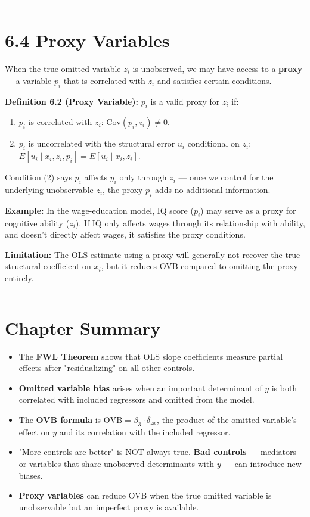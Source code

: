 \medskip\hrule\medskip

\section{6.4 Proxy Variables}

When the true omitted variable $z_i$ is unobserved, we may have access to a \textbf{proxy} --- a variable $p_i$ that is correlated with $z_i$ and satisfies certain conditions.

\textbf{Definition 6.2 (Proxy Variable):} $p_i$ is a valid proxy for $z_i$ if:
\begin{enumerate}
\item $p_i$ is correlated with $z_i$: $\text{Cov}(p_i, z_i) \neq 0$.
\item $p_i$ is uncorrelated with the structural error $u_i$ conditional on $z_i$: $E[u_i \mid x_i, z_i, p_i] = E[u_i \mid x_i, z_i]$.
\end{enumerate}

Condition (2) says $p_i$ affects $y_i$ only through $z_i$ --- once we control for the underlying unobservable $z_i$, the proxy $p_i$ adds no additional information.

\textbf{Example:} In the wage-education model, IQ score ($p_i$) may serve as a proxy for cognitive ability ($z_i$). If IQ only affects wages through its relationship with ability, and doesn't directly affect wages, it satisfies the proxy conditions.

\textbf{Limitation:} The OLS estimate using a proxy will generally not recover the true structural coefficient on $x_i$, but it reduces OVB compared to omitting the proxy entirely.

\medskip\hrule\medskip

\section{Chapter Summary}

\begin{itemize}
\item The \textbf{FWL Theorem} shows that OLS slope coefficients measure partial effects after "residualizing" on all other controls.
\item \textbf{Omitted variable bias} arises when an important determinant of $y$ is both correlated with included regressors and omitted from the model.
\item The \textbf{OVB formula} is $\text{OVB} = \beta_3 \cdot \delta_{zx}$, the product of the omitted variable's effect on $y$ and its correlation with the included regressor.
\item "More controls are better" is NOT always true. \textbf{Bad controls} --- mediators or variables that share unobserved determinants with $y$ --- can introduce new biases.
\item \textbf{Proxy variables} can reduce OVB when the true omitted variable is unobservable but an imperfect proxy is available.
\end{itemize}

